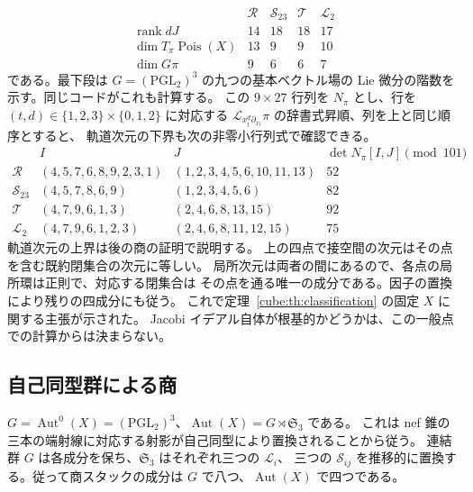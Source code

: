 \[
\begin{array}{c|rrrr}
 &\mathcal R&\mathcal S_{23}&\mathcal T&\mathcal L_2\\\hline
 \operatorname{rank} dJ&14&18&18&17\\
 \dim T_\pi\operatorname{Pois}(X)&13&9&9&10\\
 \dim G\pi&9&6&6&7
\end{array}
\]
である。最下段は $G=(\mathrm{PGL}_2)^3$ の九つの基本ベクトル場の
Lie 微分の階数を示す。同じコードがこれも計算する。
この $9\times27$ 行列を $N_\pi$ とし、行を
$(t,d)\in\{1,2,3\}\times\{0,1,2\}$ に対応する
$\mathcal L_{x_t^d\partial_{x_t}}\pi$ の辞書式昇順、列を上と同じ順序とすると、
軌道次元の下界も次の非零小行列式で確認できる。
\[
\begin{array}{c|l|l|r}
 &I&J&\det N_\pi[I,J]\pmod {101}\\\hline
\mathcal R&(4,5,7,6,8,9,2,3,1)&(1,2,3,4,5,6,10,11,13)&52\\
\mathcal S_{23}&(4,5,7,8,6,9)&(1,2,3,4,5,6)&82\\
\mathcal T&(4,7,9,6,1,3)&(2,4,6,8,13,15)&92\\
\mathcal L_2&(4,7,9,6,1,2,3)&(2,4,6,8,11,12,15)&75
\end{array}
\]
軌道次元の上界は後の商の証明で説明する。
上の四点で接空間の次元はその点を含む既約閉集合の次元に等しい。
局所次元は両者の間にあるので、各点の局所環は正則で、対応する閉集合は
その点を通る唯一の成分である。因子の置換により残りの四成分にも従う。
これで定理~\ref{cube:th:classification} の固定 $X$ に関する主張が示された。
Jacobi イデアル自体が根基的かどうかは、この一般点での計算からは決まらない。

\subsection{自己同型群による商}
$G=\operatorname{Aut}^0(X)=(\mathrm{PGL}_2)^3$、$\operatorname{Aut}(X)=G\rtimes\mathfrak S_3$ である。
これは nef 錐の三本の端射線に対応する射影が自己同型により置換されることから従う。
連結群 $G$ は各成分を保ち、$\mathfrak S_3$ はそれぞれ三つの $\mathcal L_i$、
三つの $\mathcal S_{ij}$ を推移的に置換する。従って商スタックの成分は
$G$ で八つ、$\operatorname{Aut}(X)$ で四つである。

